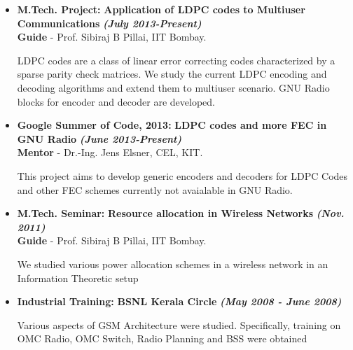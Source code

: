 \documentclass[a4paper,10pt]{article}
\begin{document}
 \begin{itemize}
 \setlength{\itemsep}{1pt}
  \item \textbf{M.Tech. Project:} \textbf{Application of LDPC codes to Multiuser Communications} \textbf \emph{(July 2013-Present)} \\
        {\textbf{Guide} - Prof. Sibiraj B Pillai, IIT Bombay.}            %

LDPC codes are a class of linear error correcting codes characterized by a sparse parity check matrices. 
We study the current LDPC encoding and decoding algorithms and extend them to multiuser scenario.
GNU Radio blocks for encoder and decoder are developed.

 \item \textbf{Google Summer of Code, 2013:} \textbf{LDPC codes and more FEC in GNU Radio}  \textbf \emph{(June 2013-Present)}\\
        {\textbf{Mentor} - Dr.-Ing. Jens Elsner, CEL, KIT.   }          %

        This project aims to develop generic encoders and decoders for LDPC Codes and other FEC schemes currently not avaialable in
        GNU Radio.
        
 \item \textbf{M.Tech. Seminar:} \textbf{Resource allocation in Wireless Networks}  \textbf \emph{(Nov. 2011)}\\
        {\textbf{Guide} - Prof. Sibiraj B Pillai, IIT Bombay.   }          %

       We studied various power allocation schemes in a wireless network in an Information Theoretic setup

  \item \textbf{Industrial Training:} \textbf{BSNL Kerala Circle}  \textbf \emph{(May 2008 - June 2008)}        

  Various aspects of GSM Architecture were studied. Specifically, training on OMC Radio, OMC Switch, Radio Planning and BSS were 
  obtained

 \end{itemize}
\end{document}
